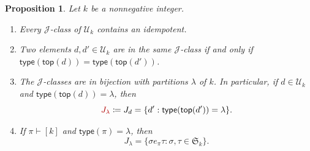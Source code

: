 \documentclass[10pt]{amsart}
\newtheorem{prop}[theorem]{Proposition}
\theoremstyle{definition}
\theoremstyle{remark}
\newcommand{\defncolor}{\color{darkred}}
\begin{document}
\begin{prop}\label{prop:charJclass}
Let $k$ be a nonnegative integer. 
\begin{enumerate}[label=(\alph*)]
    \item \label{35a}Every $\mathscr{J}$-class of $\mathcal{U}_k$ contains an idempotent. 
    \item\label{35b} Two elements $d, d' \in \mathcal{U}_k$ are in the same $\mathscr{J}$-class if and only if $\mathsf{type}(\mathsf{top}(d)) = \mathsf{type}(\mathsf{top}(d'))$.
    \item\label{35c} The $\mathscr{J}$-classes are in bijection with partitions $\lambda$ of $k$. In particular, if $d\in \mathcal{U}_k$ and 
    $\mathsf{type}(\mathsf{top}(d)) = \lambda$, then 
    \[ {\defncolor J_\lambda} \coloneqq J_d = \{ d' : \mathsf{type}(\mathsf{top}(d')) = \lambda\}. \]
    \item\label{35d} If $\pi\vdash [k]$ and $\mathsf{type}(\pi) = \lambda$, then 
    \[ J_{\lambda} = \{\sigma e_\pi \tau : \sigma, \tau\in \mathfrak{S}_k\}.\]
\end{enumerate}
\end{prop}
\end{document}
